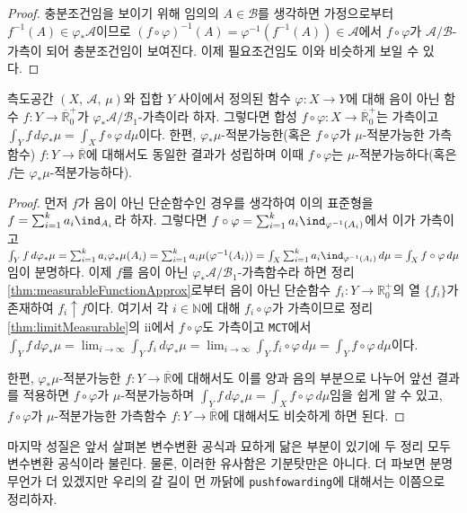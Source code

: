 \begin{proof}
    충분조건임을 보이기 위해 임의의 $A\in\mathcal{B}$를 생각하면 가정으로부터 $f^{-1}(A)\in\varphi_*\mathcal{A}$이므로 $(f\circ\varphi)^{-1}(A)=\varphi^{-1}(f^{-1}(A))\in\mathcal{A}$에서 $f\circ\varphi$가 $\mathcal{A}/\mathcal{B}$-가측이 되어 충분조건임이 보여진다. 이제 필요조건임도 이와 비슷하게 보일 수 있다.
\end{proof}

\begin{theorem}
    측도공간 $(X,\,\mathcal{A},\,\mu)$와 집합 $Y$ 사이에서 정의된 함수 $\varphi:X\to Y$에 대해 음이 아닌 함수 $f:Y\to\overline{\mathbb{R}}^+_0$가 $\varphi_*\mathcal{A}/\mathcal{B}_1$-가측이라 하자. 그렇다면 합성 $f\circ\varphi:X\to\overline{\mathbb{R}}^+_0$는 가측이고 $\int_Yf\,d\varphi_*\mu=\int_Xf\circ\varphi\,d\mu$이다. 한편, $\varphi_*\mu$-적분가능한(혹은 $f\circ\varphi$가 $\mu$-적분가능한 가측함수) $f:Y\to\overline{\mathbb{R}}$에 대해서도 동일한 결과가 성립하며 이때 $f\circ\varphi$는 $\mu$-적분가능하다(혹은 $f$는 $\varphi_*\mu$-적분가능하다).
\end{theorem}

\begin{proof}
    먼저 $f$가 음이 아닌 단순함수인 경우를 생각하여 이의 표준형을 $f=\sum_{i=1}^ka_i\ind_{A_i}$라 하자. 그렇다면 $f\circ\varphi=\sum_{i=1}^ka_i\ind_{\varphi^{-1}(A_i)}$에서 이가 가측이고 $\int_Yf\,d\varphi_*\mu=\sum_{i=1}^ka_i\varphi_*\mu(A_i)=\sum_{i=1}^ka_i\mu(\varphi^{-1}(A_i))=\int_X\sum_{i=1}^ka_i\ind_{\varphi^{-1}(A_i)}\,d\mu=\int_Xf\circ\varphi\,d\mu$임이 분명하다. 이제 $f$를 음이 아닌 $\varphi_*\mathcal{A}/\mathcal{B}_1$-가측함수라 하면 정리 \ref{thm:measurableFunctionApprox}로부터 음이 아닌 단순함수 $f_i:Y\to\mathbb{R}^+_0$의 열 $\{f_i\}$가 존재하여 $f_i\uparrow f$이다. 여기서 각 $i\in\mathbb{N}$에 대해 $f_i\circ\varphi$가 가측이므로 정리 \ref{thm:limitMeasurable}의 ii에서 $f\circ\varphi$도 가측이고 \texttt{MCT}에서 $\int_Yf\,d\varphi_*\mu=\lim_{i\to\infty}\int_Yf_i\,d\varphi_*\mu=\lim_{i\to\infty}\int_Yf_i\circ\varphi\,d\mu=\int_Yf\circ\varphi\,d\mu$이다.


    한편, $\varphi_*\mu$-적분가능한 $f:Y\to\overline{\mathbb{R}}$에 대해서도 이를 양과 음의 부분으로 나누어 앞선 결과를 적용하면 $f\circ\varphi$가 $\mu$-적분가능하며 $\int_Yf\,d\varphi_*\mu=\int_Xf\circ\varphi\,d\mu$임을 쉽게 알 수 있고, $f\circ\varphi$가 $\mu$-적분가능한 가측함수 $f:Y\to\overline{\mathbb{R}}$에 대해서도 비슷하게 하면 된다.
\end{proof}

마지막 성질은 앞서 살펴본 변수변환 공식과 묘하게 닮은 부분이 있기에 두 정리 모두 변수변환 공식이라 불린다. 물론, 이러한 유사함은 기분탓만은 아니다. 더 파보면 분명 무언가 더 있겠지만 우리의 갈 길이 먼 까닭에 \texttt{pushfowarding}에 대해서는 이쯤으로 정리하자.\footnotemark

